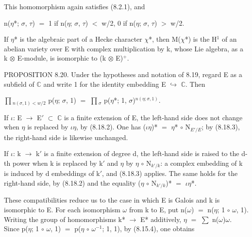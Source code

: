 \documentclass[10pt,twoside]{article}
\begin{document}
This homomorphism again satisfies (8.2.1), and\par
n(\ensuremath{η}*; \ensuremath{σ}, \ensuremath{τ}) \ensuremath{=} 1    if n(\ensuremath{η}; \ensuremath{σ}, \ensuremath{τ}) \ensuremath{<} w/2, 0    if n(\ensuremath{η}; \ensuremath{σ}, \ensuremath{τ}) \ensuremath{>} w/2.\par
If \ensuremath{η}* is the algebraic part of a Hecke character \ensuremath{χ}*, then M(\ensuremath{χ}*) is the H\ensuremath{^{1}} of an abelian variety over E with complex multiplication by k, whose Lie algebra, as a k \ensuremath{⊗} E-module, is isomorphic to (k \ensuremath{⊗} E)\ensuremath{^{+}}.\par
PROPOSITION 8.20. Under the hypotheses and notation of 8.19, regard E as a subfield of \ensuremath{ℂ} and write 1 for the identity embedding E \ensuremath{↪} \ensuremath{ℂ}. Then\par
\ensuremath{∏}\ensuremath{_{n(σ,1)<w/2}} p(\ensuremath{η}; \ensuremath{σ}, 1) \ensuremath{=} \ensuremath{∏}\ensuremath{_{σ}} p(\ensuremath{η}*; 1, \ensuremath{σ})\ensuremath{^{n(η;σ,1)}}.\par
If \ensuremath{ι}: E \ensuremath{→} E\ensuremath{′} \ensuremath{⊂} \ensuremath{ℂ} is a finite extension of E, the left-hand side does not change when \ensuremath{η} is replaced by \ensuremath{ι}\ensuremath{η}, by (8.18.2). One has (\ensuremath{ι}\ensuremath{η})* \ensuremath{=} \ensuremath{η}* \ensuremath{∘} N\ensuremath{_{E′/E}}; by (8.18.3), the right-hand side is likewise unchanged.\par
If \ensuremath{ι}: k \ensuremath{→} k\ensuremath{′} is a finite extension of degree d, the left-hand side is raised to the d-th power when k is replaced by k\ensuremath{′} and \ensuremath{η} by \ensuremath{η} \ensuremath{∘} N\ensuremath{_{k′/k}}: a complex embedding of k is induced by d embeddings of k\ensuremath{′}, and (8.18.3) applies. The same holds for the right-hand side, by (8.18.2) and the equality (\ensuremath{η} \ensuremath{∘} N\ensuremath{_{k′/k}})* \ensuremath{=} \ensuremath{ι}\ensuremath{η}*.\par
These compatibilities reduce us to the case in which E is Galois and k is isomorphic to E. For each isomorphism \ensuremath{ω} from k to E, put n(\ensuremath{ω}) \ensuremath{=} n(\ensuremath{η}; 1 \ensuremath{∘} \ensuremath{ω}, 1). Writing the group of homomorphisms k* \ensuremath{→} E* additively, \ensuremath{η} \ensuremath{=} \ensuremath{∑} n(\ensuremath{ω})\ensuremath{ω}. Since p(\ensuremath{η}; 1 \ensuremath{∘} \ensuremath{ω}, 1) \ensuremath{=} p(\ensuremath{η} \ensuremath{∘} \ensuremath{ω}\ensuremath{^{-1}}; 1, 1), by (8.15.4), one obtains\par
\end{document}
